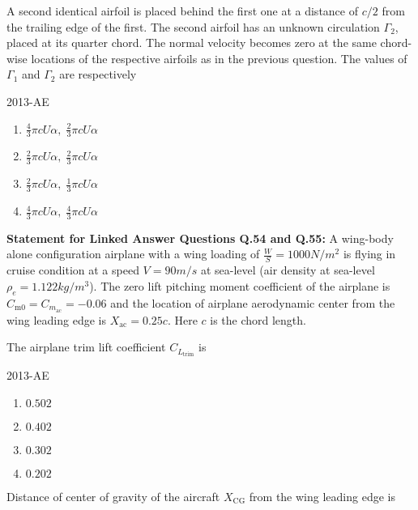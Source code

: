 \iffalse
\chapter{2013}
\author{ee24btech11056}
\section{ae}
\fi
\item A second identical airfoil is placed behind the first one at a distance of $c/2$ from the trailing edge of the first. The second airfoil has an unknown circulation $\Gamma_2$, placed at its quarter chord. The normal velocity becomes zero at the same chord-wise locations of the respective airfoils as in the previous question. The values of $\Gamma_1$ and $\Gamma_2$ are respectively
	
\hfill{2013-AE}

\begin{enumerate}
    \item $\frac{4}{3} \pi c U \alpha, \; \frac{2}{3} \pi c U \alpha$
    \item $\frac{2}{3} \pi c U \alpha, \; \frac{2}{3} \pi c U \alpha$
    \item $\frac{2}{3} \pi c U \alpha, \; \frac{1}{3} \pi c U \alpha$
    \item $\frac{4}{3} \pi c U \alpha, \; \frac{4}{3} \pi c U \alpha$
\end{enumerate}

\textbf{Statement for Linked Answer Questions Q.54 and Q.55:} A wing-body alone configuration airplane with a wing loading of $\frac{W}{S} = 1000N/m^2$ is flying in cruise condition at a speed $V = 90m/s$ at sea-level (air density at sea-level $\rho_e = 1.122kg/m^3$). The zero lift pitching moment coefficient of the airplane is $C_{\text{m0}} = C_{m_{\text{ac}}} = -0.06$ and the location of airplane aerodynamic center from the wing leading edge is $X_{\text{ac}} = 0.25c$. Here $c$ is the chord length.

\item The airplane trim lift coefficient $C_{L_{\text{trim}}}$ is

\hfill{2013-AE}

\begin{enumerate}
    \item $0.502$
    \item $0.402$
    \item $0.302$
    \item $0.202$\\
\end{enumerate}
\item Distance of center of gravity of the aircraft $X_{\text{CG}}$ from the wing leading edge is


